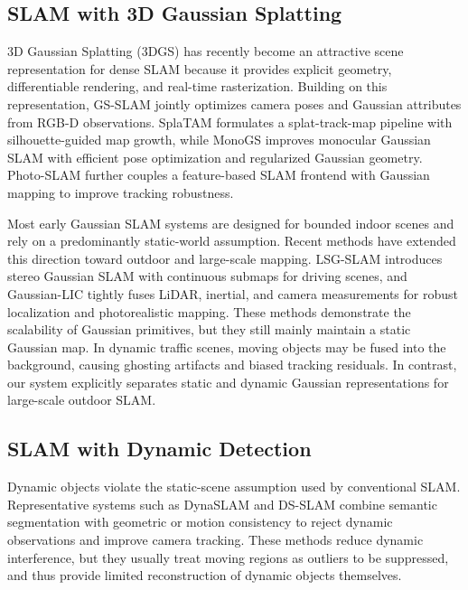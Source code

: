 \documentclass[letterpaper, 10 pt, conference]{ieeeconf}  %
\begin{document}
\subsection{SLAM with 3D Gaussian Splatting}
3D Gaussian Splatting (3DGS) \cite{3dgs} has recently become an attractive scene representation for dense SLAM because it provides explicit geometry, differentiable rendering, and real-time rasterization. Building on this representation, GS-SLAM \cite{gsslam} jointly optimizes camera poses and Gaussian attributes from RGB-D observations. SplaTAM \cite{splatam} formulates a splat-track-map pipeline with silhouette-guided map growth, while MonoGS \cite{monogs} improves monocular Gaussian SLAM with efficient pose optimization and regularized Gaussian geometry. Photo-SLAM \cite{photo-slam} further couples a feature-based SLAM frontend with Gaussian mapping to improve tracking robustness.

Most early Gaussian SLAM systems are designed for bounded indoor scenes and rely on a predominantly static-world assumption. Recent methods have extended this direction toward outdoor and large-scale mapping. LSG-SLAM \cite{lsg-slam} introduces stereo Gaussian SLAM with continuous submaps for driving scenes, and Gaussian-LIC \cite{gaussian-lic} tightly fuses LiDAR, inertial, and camera measurements for robust localization and photorealistic mapping. These methods demonstrate the scalability of Gaussian primitives, but they still mainly maintain a static Gaussian map. In dynamic traffic scenes, moving objects may be fused into the background, causing ghosting artifacts and biased tracking residuals. In contrast, our system explicitly separates static and dynamic Gaussian representations for large-scale outdoor SLAM.

\subsection{SLAM with Dynamic Detection}
Dynamic objects violate the static-scene assumption used by conventional SLAM. Representative systems such as DynaSLAM \cite{dynaslam} and DS-SLAM \cite{ds-slam} combine semantic segmentation with geometric or motion consistency to reject dynamic observations and improve camera tracking. These methods reduce dynamic interference, but they usually treat moving regions as outliers to be suppressed, and thus provide limited reconstruction of dynamic objects themselves.
\end{document}
